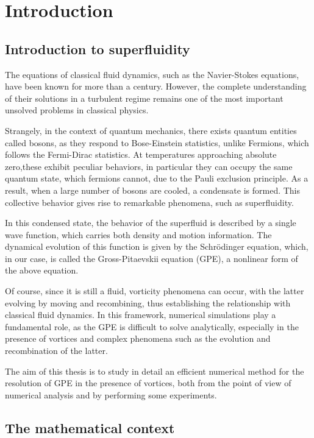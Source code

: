 \chapter{Introduction}

\section{Introduction to superfluidity}

The equations of classical fluid dynamics, such as the Navier-Stokes equations, have been known for more than a century. However, the complete understanding of their solutions in a turbulent regime remains one of the most important unsolved problems in classical physics.

Strangely, in the context of quantum mechanics, there exists quantum entities called bosons, as they respond to Bose-Einstein statistics, unlike Fermions, which follows the Fermi-Dirac statistics. At temperatures approaching absolute zero,these exhibit peculiar behaviors, in particular they can occupy the same quantum state, which fermions cannot, due to the Pauli exclusion principle. As a result, when a large number of bosons are cooled, a condensate is formed. This collective behavior gives rise to remarkable phenomena, such as superfluidity.

In this condensed state, the behavior of the superfluid is described by a single wave function, which carries both density and motion information. The dynamical evolution of this function is given by the Schrödinger equation, which, in our case, is called the Gross-Pitaevskii equation (GPE), a nonlinear form of the above equation.

Of course, since it is still a fluid, vorticity phenomena can occur, with the latter evolving by moving and recombining, thus establishing the relationship with classical fluid dynamics. In this framework, numerical simulations play a fundamental role, as the GPE is difficult to solve analytically, especially in the presence of vortices and complex phenomena such as the evolution and recombination of the latter. 

The aim of this thesis is to study in detail an efficient numerical method for the resolution of GPE in the presence of vortices, both from the point of view of numerical analysis and by performing some experiments. 

\newpage

\section{The mathematical context}

